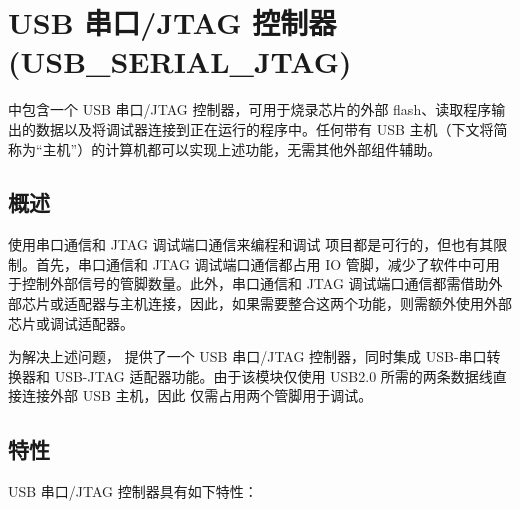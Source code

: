 \documentclass[main\_\_CN.tex]{subfiles}
\begin{document}

\ifglobal
\else
    {\let\clearpage\relax \listoftodos}
    {\let\clearpage\relax \listofdonetodos}
    \tableofcontents
\fi



\hypertarget{usbserialjtag}{}
\chapter{USB 串口/JTAG 控制器 (USB\_SERIAL\_JTAG)}
\label{mod:usbserialjtag}

\chipname{} 中包含一个 USB 串口/JTAG 控制器，可用于烧录芯片的外部 flash、读取程序输出的数据以及将调试器连接到正在运行的程序中。任何带有 USB 主机（下文将简称为“主机”）的计算机都可以实现上述功能，无需其他外部组件辅助。

\section{概述}

使用串口通信和 JTAG 调试端口通信来编程和调试 \chipname{} 项目都是可行的，但也有其限制。首先，串口通信和 JTAG 调试端口通信都占用 IO 管脚，减少了软件中可用于控制外部信号的管脚数量。此外，串口通信和 JTAG 调试端口通信都需借助外部芯片或适配器与主机连接，因此，如果需要整合这两个功能，则需额外使用外部芯片或调试适配器。

为解决上述问题，\chipname{} 提供了一个 USB 串口/JTAG 控制器，同时集成 USB-串口转换器和 USB-JTAG 适配器功能。由于该模块仅使用 USB2.0 所需的两条数据线直接连接外部 USB 主机，因此 \chipname{} 仅需占用两个管脚用于调试。


\section{特性}
\label{sec:usbserialjtag-features}

USB 串口/JTAG 控制器具有如下特性：
\end{document}
